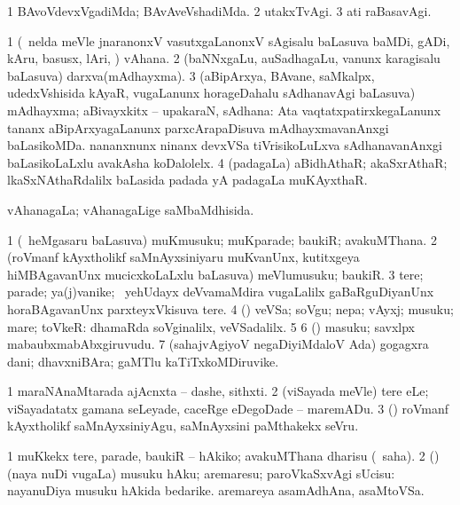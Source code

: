 \bentry
{} 
\gl{\kirxvi}
\expl{}
\bmng
\bnum
\num{1} BAvoVdevxVgadiMda; BAvAveVshadiMda. 
\num{2} utakxTvAgi. 
\num{3} ati raBasavAgi. 
\enum
\emng
\eentry

\bentry
{} 
\gl{\nA}
\expl{}
\bmng
\bnum
\num{1} (\kanmu\ nelda meVle jnaranonxV vasutxgaLanonxV sAgisalu baLasuva baMDi, gADi, kAru, basusx, lAri, \mo) vAhana. 
\num{2} (baNNxgaLu, auSadhagaLu, \mo vanunx karagisalu baLasuva) darxva(mAdhayxma). 
\num{3} (aBipArxya, BAvane, saMkalpx, udedxVshisida kAyaR, \mo vugaLanunx horageDahalu sAdhanavAgi baLasuva) mAdhayxma; aBivayxkitx -- upakaraN, sAdhana:  Ata vaqtatxpatirxkegaLanunx tananx aBipArxyagaLanunx parxcArapaDisuva mAdhayxmavanAnxgi baLasikoMDa.  nananxnunx ninanx devxVSa tiVrisikoLuLxva sAdhanavanAnxgi baLasikoLaLxlu avakAsha koDalolelx. 
\num{4} (padagaLa) aBidhAthaR; akaSxrAthaR; lkaSxNAthaRdalilx baLasida padada yA padagaLa muKAyxthaR. 
\enum
\emng
\eentry

\bentry
{} 
\gl{\gu}
\expl{}
\bmng
 vAhanagaLa; vAhanagaLige saMbaMdhisida. 
\emng
\eentry

\bentry
{} 
\gl{\nA}
\expl{}
\bmng
\bnum
\num{1} (\sA\ heMgasaru baLasuva) muKmusuku; muKparade; baukiR; avakuMThana. 
\num{2} (roVmanf kAyxtholikf saMnAyxsiniyaru muKvanUnx, kutitxgeya hiMBAgavanUnx mucicxkoLaLxlu baLasuva) meVlumusuku; baukiR. 
\num{3} tere; parade; ya(j)vanike; \kanmu\ yehUdayx deVvamaMdira \mo vugaLalilx gaBaRguDiyanUnx horaBAgavanUnx parxteyxVkisuva tere. 
\num{4} (\rUpa) veVSa; soVgu; nepa; vAyxj; musuku; mare; toVkeR:  dhamaRda soVginalilx, veVSadalilx. 
\num{5}  
\num{6} (\CA) masuku; savxlpx mabaubxmabAbxgiruvudu. 
\num{7} (sahajvAgiyoV negaDiyiMdaloV Ada) gogagxra dani; dhavxniBAra; gaMTlu kaTiTxkoMDiruvike. 
\enum
\emng

\noindent 
\gl{\pagu}
\expl{}
\bmng
\bnum
\num{1}  maraNAnaMtarada ajAcnxta -- dashe, sithxti. 
\num{2}  (viSayada meVle) tere eLe; viSayadatatx gamana seLeyade, caceRge eDegoDade -- maremADu. 
\num{3}  (\kanmu) roVmanf kAyxtholikf saMnAyxsiniyAgu, saMnAyxsini paMthakekx seVru. 
\enum
\emng
\eentry

\bentry 
{} 
\gl{\sakirx}
\expl{}
\bmng
\bnum
\num{1} muKkekx tere, parade, baukiR -- hAkiko; avakuMThana dharisu (\akirx\ saha). 
\num{2} (\rUpa) (naya nuDi \mo vugaLa) musuku hAku; aremaresu; paroVkaSxvAgi sUcisu:  nayanuDiya musuku hAkida bedarike.  aremareya asamAdhAna, asaMtoVSa. 
\enum
\emng
\eentry


